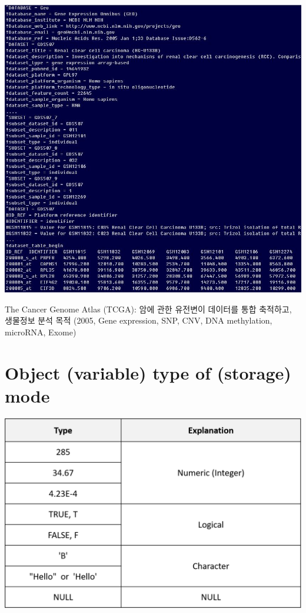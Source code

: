 \documentclass[
]{book}
\begin{document}
\includegraphics{images/geometa.JPG}

The Cancer Genome Atlas (TCGA): 암에 관한 유전변이 데이터를 통합 축적하고, 생물정보 분석 목적 (2005, Gene expression, SNP, CNV, DNA methylation, microRNA, Exome)

\hypertarget{object-variable-type-of-storage-mode}{%
\section{Object (variable) type of (storage) mode}\label{object-variable-type-of-storage-mode}}

\includegraphics{images/01/01-13.PNG}
\end{document}
